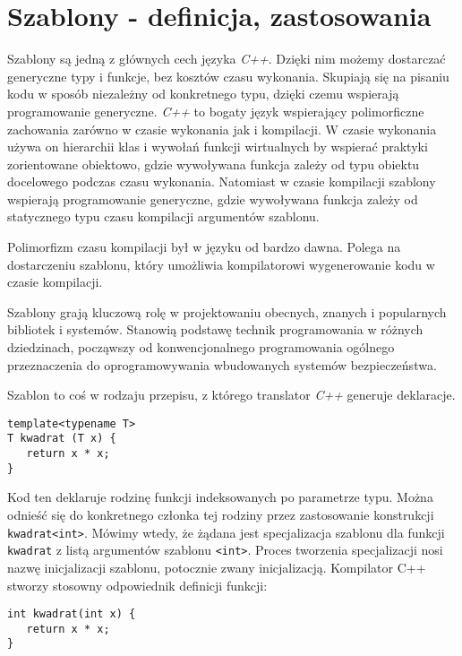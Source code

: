 \documentclass[11pt, a4paper]{article}
\begin{document}
\lstset{language=C++}

\section{Szablony - definicja, zastosowania}
Szablony są jedną z głównych cech języka \emph{C++}. Dzięki nim możemy dostarczać generyczne typy i funkcje, bez kosztów czasu wykonania. Skupiają się na pisaniu kodu w sposób niezależny od konkretnego typu, dzięki czemu wspierają programowanie generyczne. \emph{C++} to bogaty język wspierający polimorficzne zachowania zarówno w czasie wykonania jak i kompilacji. W czasie wykonania używa on hierarchii klas i wywołań funkcji wirtualnych by wspierać praktyki zorientowane obiektowo, gdzie wywoływana funkcja zależy od typu obiektu docelowego podczas czasu wykonania. Natomiast w czasie kompilacji szablony wspierają programowanie generyczne, gdzie wywoływana funkcja zależy od statycznego typu czasu kompilacji argumentów szablonu.

Polimorfizm czasu kompilacji był w języku od bardzo dawna. Polega na dostarczeniu szablonu, który umożliwia kompilatorowi wygenerowanie kodu w czasie kompilacji.

Szablony grają kluczową rolę w projektowaniu obecnych, znanych i popularnych bibliotek i systemów. Stanowią podstawę technik programowania w różnych dziedzinach, począwszy od konwencjonalnego programowania ogólnego przeznaczenia do oprogramowywania wbudowanych 
systemów bezpieczeństwa.

Szablon to coś w rodzaju przepisu, z którego translator \emph{C++} generuje deklaracje.

\begin{lstlisting}[frame=single]
template<typename T>
T kwadrat (T x) {
   return x * x;
}
\end{lstlisting}

Kod ten deklaruje rodzinę funkcji indeksowanych po parametrze typu. Można odnieść się do konkretnego członka tej rodziny przez zastosowanie konstrukcji \verb#kwadrat<int>#. Mówimy wtedy, że żądana jest specjalizacja szablonu dla funkcji \verb#kwadrat# z listą argumentów szablonu \verb#<int>#. Proces tworzenia specjalizacji nosi nazwę inicjalizacji szablonu, potocznie zwany inicjalizacją. Kompilator C++ stworzy stosowny odpowiednik definicji funkcji:
\newpage

\begin{lstlisting}[frame=single]
int kwadrat(int x) {
   return x * x;
}
\end{lstlisting}
\end{document}
